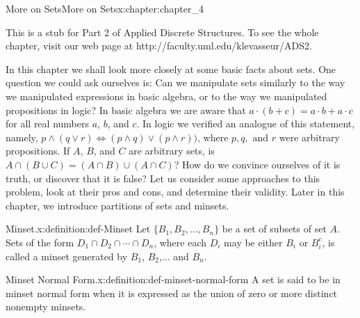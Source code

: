 \documentclass[oneside,10pt,]{book}
\numberwithin{equation}{section}
\begin{document}
\begin{chapterptx}{More on Sets}{}{More on Sets}{}{}{x:chapter:chapter_4}
\begin{introduction}{}%
This is a stub for Part 2 of Applied Discrete Structures. To see the whole chapter, visit our web page at http:\slash{}\slash{}faculty.uml.edu\slash{}klevasseur\slash{}ADS2.%
\par
In this chapter we shall look more closely at some basic facts about sets. One question we could ask ourselves is: Can we manipulate sets similarly to the way we manipulated expressions in basic algebra, or to the way we manipulated propositions in logic? In basic algebra we are aware that \(a \cdot  (b + c) = a\cdot  b + a \cdot  c\) for all real numbers \(a\), \(b\), and \(c\). In logic we verified an analogue of this statement, namely, \(p
\land  ( q \lor  r) \Leftrightarrow  (p \land  q)\lor  (p \land  r))\), where \(p, q, \textrm{ and } r\) were arbitrary propositions. If \(A\), \(B\), and \(C\) are arbitrary sets, is \(A \cap  (B \cup  C) = (A \cap  B) \cup  (A \cap  C)\)? How do we convince ourselves of it is truth, or discover that it is false? Let us consider some approaches to this problem, look at their pros and cons, and determine their validity.  Later in this chapter, we introduce partitions of sets and minsets.%
\end{introduction}%
\begin{definition}{Minset.}{x:definition:def-Minset}%
%
Let \(\{B_1, B_2,\ldots,B_n\}\) be a set of subsets of  set \(A\). Sets of the form \(D_1\cap D_2\cap
\cdots \cap D_n\), where each \(D_i\) may be either \(B_i\) or \(B_i^c\), is called a minset generated by \(B_1\), \(B_2\),... and  \(B_n\).%
\end{definition}
\begin{definition}{Minset Normal Form.}{x:definition:def-minset-normal-form}%
%
A set is said to be in minset normal form when it is expressed as the union of zero or more distinct nonempty minsets.%
\end{definition}
\end{chapterptx}
%
%
\typeout{************************************************}
\typeout{************************************************}
%
\end{document}
